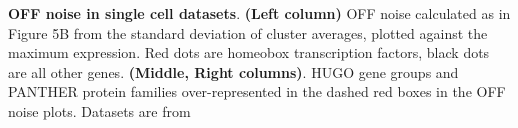 \textbf{OFF noise in single cell datasets}. \textbf{(Left column)} OFF noise calculated as in Figure 5B from the standard deviation of cluster averages, plotted against the maximum expression. Red dots are homeobox transcription factors, black dots are all other genes. \textbf{(Middle, Right columns)}. HUGO gene groups and PANTHER protein families over-represented in the dashed red boxes in the OFF noise plots. %
Datasets are from \citep{Zeisel_2015,Tasic_2016,Zeisel_2018,Saunders_2018,Tasic_2018}